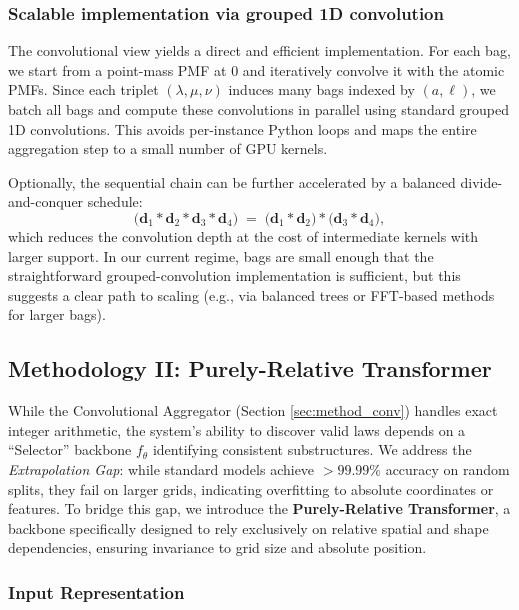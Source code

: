 \documentclass{article}
\theoremstyle{plain}
\theoremstyle{definition}
\theoremstyle{remark}
\begin{document}
\subsubsection{Scalable implementation via grouped 1D convolution}
\label{sec:implementation}

The convolutional view yields a direct and efficient implementation.
For each bag, we start from a point-mass PMF at $0$ and iteratively convolve it with the atomic PMFs.
Since each triplet $(\lambda,\mu,\nu)$ induces many bags indexed by $(a,\ell)$, we batch all bags and compute these convolutions in parallel using standard grouped 1D convolutions. 
This avoids per-instance Python loops and maps the entire aggregation step to a small number of GPU kernels.

Optionally, the sequential chain can be further accelerated by a balanced divide-and-conquer schedule:
\[
\big(\mathbf d_1 * \mathbf d_2 * \mathbf d_3 * \mathbf d_4\big)
\;=\;
\big(\mathbf d_1 * \mathbf d_2\big) * \big(\mathbf d_3 * \mathbf d_4\big),
\]
which reduces the convolution depth at the cost of intermediate kernels with larger support.
In our current regime, bags are small enough that the straightforward grouped-convolution implementation is sufficient, but this suggests a clear path to scaling (e.g., via balanced trees or FFT-based methods for larger bags).

	

	
\subsection{Methodology II: Purely-Relative Transformer}
\label{sec:method_selector}
While the Convolutional Aggregator (Section \ref{sec:method_conv}) handles exact integer arithmetic, the system's ability to discover valid laws depends on a ``Selector'' backbone $f_\theta$ identifying consistent substructures.
We address the \textit{Extrapolation Gap}:
while standard models achieve $>99.99\%$ accuracy on random splits, they fail on larger grids, indicating overfitting to absolute coordinates or features.
To bridge this gap, we introduce the \textbf{Purely-Relative Transformer}, a backbone specifically designed to rely exclusively on relative spatial and shape dependencies, ensuring invariance to grid size and absolute position.

\subsubsection{Input Representation}
\end{document}
